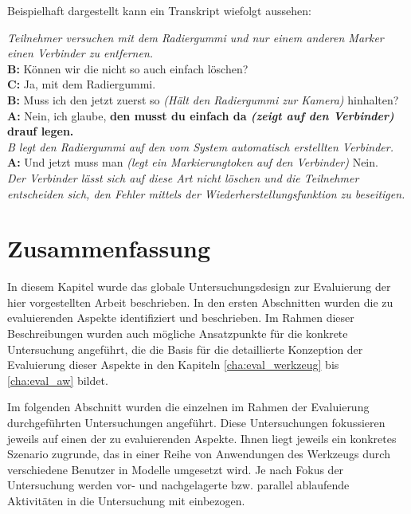 Beispielhaft dargestellt kann ein Transkript wiefolgt aussehen:
\begin{transkript}
	\emph{Teilnehmer versuchen mit dem Radiergummi und nur einem anderen Marker einen Verbinder zu entfernen.}\\
	\textbf{B:} Können wir die nicht so auch einfach löschen?\\
	\textbf{C:} Ja, mit dem Radiergummi.\\
	\textbf{B:} Muss ich den jetzt zuerst so \emph{(Hält den Radiergummi zur Kamera)} hinhalten?\\
	\textbf{A:} Nein, ich glaube, \textbf{den musst du einfach da \emph{(zeigt auf den Verbinder)} drauf legen.}\\
	\emph{B legt den Radiergummi auf den vom System automatisch erstellten Verbinder.}\\
	\textbf{A:} Und jetzt muss man \emph{(legt ein Markierungtoken auf den Verbinder)} Nein.\\
	\emph{Der Verbinder lässt sich auf diese Art nicht löschen und die Teilnehmer entscheiden sich, den Fehler mittels der Wiederherstellungsfunktion zu beseitigen.}
\end{transkript}


\section{Zusammenfassung}
\label{sec:eval_ueberblick_zusammenfassung}

In diesem Kapitel wurde das globale Untersuchungsdesign zur Evaluierung der hier vorgestellten Arbeit beschrieben. In den ersten Abschnitten wurden die zu evaluierenden Aspekte identifiziert und beschrieben. Im Rahmen dieser Beschreibungen wurden auch mögliche Ansatzpunkte für die konkrete Untersuchung angeführt, die die Basis für die detaillierte Konzeption der Evaluierung dieser Aspekte in den Kapiteln \ref{cha:eval_werkzeug} bis \ref{cha:eval_aw} bildet. 

Im folgenden Abschnitt wurden die einzelnen im Rahmen der Evaluierung durchgeführten Untersuchungen angeführt. Diese Untersuchungen fokussieren jeweils auf einen der zu evaluierenden Aspekte. Ihnen liegt jeweils ein konkretes Szenario zugrunde, das in einer Reihe von Anwendungen des Werkzeugs durch verschiedene Benutzer in Modelle umgesetzt wird. Je nach Fokus der Untersuchung werden vor- und nachgelagerte bzw. parallel ablaufende Aktivitäten in die Untersuchung mit einbezogen.

